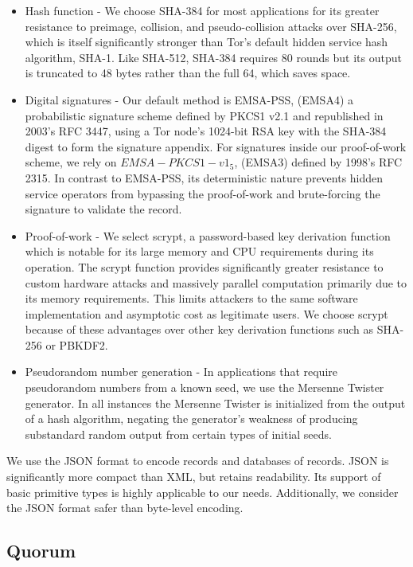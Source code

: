 \begin{itemize}
	\item Hash function - We choose SHA-384 for most applications for its greater resistance to preimage, collision, and pseudo-collision attacks over SHA-256, which is itself significantly stronger than Tor's default hidden service hash algorithm, SHA-1. Like SHA-512, SHA-384 requires 80 rounds but its output is truncated to 48 bytes rather than the full 64, which saves space.
	\item Digital signatures - Our default method is EMSA-PSS, (EMSA4) a probabilistic signature scheme defined by PKCS1 v2.1 and republished in 2003's RFC 3447, using a Tor node's 1024-bit RSA key with the SHA-384 digest to form the signature appendix. For signatures inside our proof-of-work scheme, we rely on $EMSA-PKCS1-v1_5$, (EMSA3) defined by 1998's RFC 2315. In contrast to EMSA-PSS, its deterministic nature prevents hidden service operators from bypassing the proof-of-work and brute-forcing the signature to validate the record.
	\item Proof-of-work - We select scrypt, a password-based key derivation function which is notable for its large memory and CPU requirements during its operation. The scrypt function provides significantly greater resistance to custom hardware attacks and massively parallel computation primarily due to its memory requirements. This limits attackers to the same software implementation and asymptotic cost as legitimate users.\cite{percival2009stronger} We choose scrypt because of these advantages over other key derivation functions such as SHA-256 or PBKDF2.
	\item Pseudorandom number generation - In applications that require pseudorandom numbers from a known seed, we use the Mersenne Twister generator. In all instances the Mersenne Twister is initialized from the output of a hash algorithm, negating the generator's weakness of producing substandard random output from certain types of initial seeds.
\end{itemize}

We use the JSON format to encode records and databases of records. JSON is significantly more compact than XML, but retains readability. Its support of basic primitive types is highly applicable to our needs. Additionally, we consider the JSON format safer than byte-level encoding.

\subsection{Quorum}

